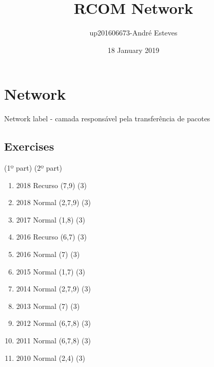 \documentclass{article}
\title{RCOM Network}
\author{up201606673-André Esteves}
\date{18 January 2019}
\begin{document}
\maketitle

\section{Network}
Network label - camada responsável pela transferência de pacotes

\subsection{Exercises}
(1º part) (2º part)
\begin{enumerate}
    \item 2018 Recurso (7,9) (3)
    \item 2018 Normal (2,7,9) (3)
    \item 2017 Normal (1,8) (3)
    \item 2016 Recurso (6,7) (3)
    \item 2016 Normal (7) (3)
    \item 2015 Normal (1,7) (3)
    \item 2014 Normal (2,7,9) (3)
    \item 2013 Normal (7) (3)
    \item 2012 Normal (6,7,8) (3)
    \item 2011 Normal (6,7,8) (3)
    \item 2010 Normal (2,4) (3)
\end{enumerate}
\end{document}
